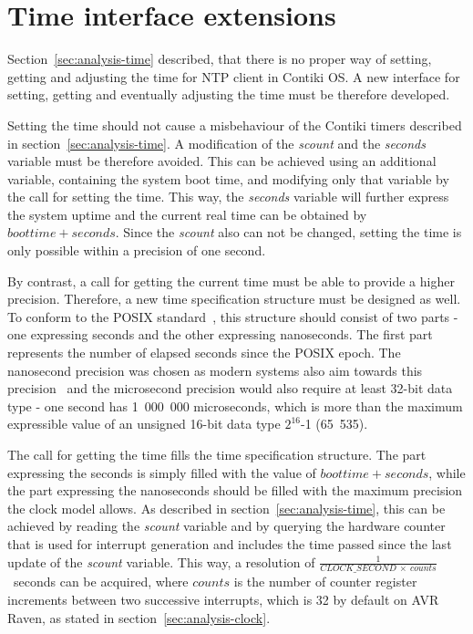
\section{Time interface extensions}\label{sec:analysis-interface}
Section~\ref{sec:analysis-time} described, that there is no proper
way of setting, getting and adjusting the time for NTP client in Contiki OS.
A new interface for setting, getting and eventually adjusting the time
must be therefore developed.

Setting the time should not cause a misbehaviour of the Contiki timers
described in section~\ref{sec:analysis-time}.
A modification of the {\it{scount}} and the {\it{seconds}} variable must be therefore avoided.
This can be achieved using an additional variable, containing the system boot time,
and modifying only that variable by the call for setting the time.
This way, the {\it{seconds}} variable will further express the system uptime
and the current real time can be obtained by $boottime + seconds$.
Since the {\it{scount}} also can not be changed, setting the time is only possible
within a precision of one second.

By contrast, a call for getting the current time must be able to provide a higher precision.
Therefore, a new time specification structure must be designed as well.
To conform to the POSIX standard~\cite{posix}, this structure should consist of two parts -
one expressing seconds and the other expressing nanoseconds.
The first part represents the number of elapsed seconds since the POSIX epoch.
The nanosecond precision was chosen as modern systems also aim towards this
precision~\cite{posix,ntp-precision} and
the microsecond precision would also require at least 32-bit data type -
one second has 1~000~000 microseconds, which is more than the maximum expressible value of
an unsigned 16-bit data type $2^{16}$-1 (65~535).

The call for getting the time fills the time specification structure.
The part expressing the seconds is simply filled with the value of $boottime + seconds$,
while the part expressing the nanoseconds should be filled with the maximum precision
the clock model allows.
As described in section~\ref{sec:analysis-time},
this can be achieved by reading the {\it{scount}} variable
and by querying the hardware counter that is used for
interrupt generation and includes the time passed since
the last update of the {\it{scount}} variable.
This way, a resolution of $\frac{1}{CLOCK\_SECOND~\times~counts}$~seconds can be acquired,
where $counts$ is the number of counter register increments between two successive interrupts,
which is 32 by default on AVR Raven, as stated in section~\ref{sec:analysis-clock}.

